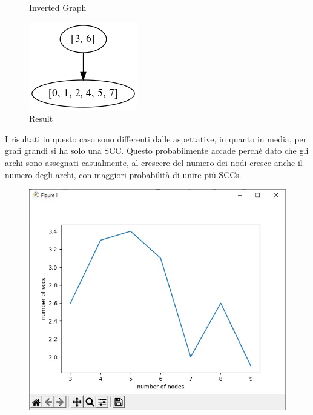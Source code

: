 \documentclass{article}
\begin{document}
\begin{figure}[!htb]
  \caption{Inverted Graph}
\endminipage\hfill
{}
  \includegraphics[width=\linewidth]{"./output/scc_example_result.png"}
  \caption{Result}
\endminipage
\end{figure}

I risultati in questo caso sono differenti dalle aspettative, in quanto in media, per grafi grandi si ha solo una SCC. Questo probabilmente accade perchè dato che gli archi sono assegnati casualmente, al crescere del numero dei nodi cresce anche il numero degli archi, con maggiori probabilità di unire più SCCs.
\begin{figure}[!h]
\centering
\includegraphics[width=0.45\linewidth]
{"./sccs_to_nodes.jpg"}
\label{graph}
\end{figure}
\end{document}
